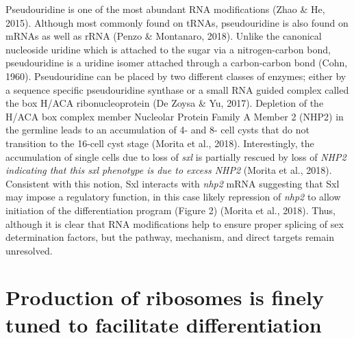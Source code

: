 \documentclass[12pt,twoside]{reedthesis}
\begin{document}
Pseudouridine is one of the most abundant RNA modifications
(Zhao \& He, 2015). Although most commonly found on tRNAs, pseudouridine is
also found on mRNAs as well as rRNA (Penzo \& Montanaro, 2018). Unlike the
canonical nucleoside uridine which is attached to the sugar via a
nitrogen-carbon bond, pseudouridine is a uridine isomer attached through
a carbon-carbon bond (Cohn, 1960). Pseudouridine can be placed by two
different classes of enzymes; either by a sequence specific
pseudouridine synthase or a small RNA guided complex called the box
H/ACA ribonucleoprotein (De Zoysa \& Yu, 2017). Depletion of the H/ACA box
complex member Nucleolar Protein Family A Member 2 (NHP2) in the
germline leads to an accumulation of 4- and 8- cell cysts that do not
transition to the 16-cell cyst stage (Morita et al., 2018). Interestingly,
the accumulation of single cells due to loss of \emph{sxl} is partially
rescued by loss of \emph{NHP2 indicating that this sxl phenotype is due to
excess NHP2} (Morita et al., 2018). Consistent with this notion, Sxl
interacts with \emph{nhp2} mRNA suggesting that Sxl may impose a regulatory
function, in this case likely repression of \emph{nhp2} to allow initiation
of the differentiation program (Figure 2) (Morita et al., 2018). Thus,
although it is clear that RNA modifications help to ensure proper
splicing of sex determination factors, but the pathway, mechanism, and
direct targets remain unresolved.

\hypertarget{production-of-ribosomes-is-finely-tuned-to-facilitate-differentiation}{%
\section{Production of ribosomes is finely tuned to facilitate differentiation}\label{production-of-ribosomes-is-finely-tuned-to-facilitate-differentiation}}
\end{document}
